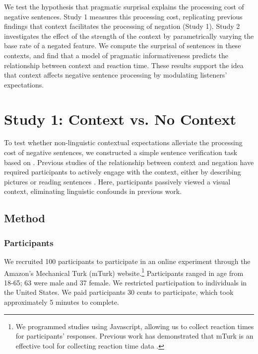 \documentclass[10pt,letterpaper]{article}
\begin{document}
We test the hypothesis that pragmatic surprisal explains the processing cost of negative sentences. Study 1 measures this processing cost, replicating previous findings that context facilitates the processing of negation (Study 1).  Study 2 investigates the effect of the strength of the context by parametrically varying the base rate of a negated feature.  We compute the surprisal of sentences in these contexts, and find that a model of pragmatic informativeness predicts the relationship between context and reaction time.  These results support the idea that context affects negative sentence processing by modulating listeners' expectations. %

\section{Study 1: Context vs. No Context}

To test whether non-linguistic contextual expectations alleviate the processing cost of negative sentences, we constructed a simple sentence verification task based on .  Previous studies of the relationship between context and negation have required participants to actively engage with the context, either by describing pictures \cite{wason1965} or reading sentences \cite{glenberg1999}.  Here, participants passively viewed a visual context, eliminating linguistic confounds in previous work.  

\subsection{Method}

\subsubsection{Participants}

We recruited 100 participants to participate in an online experiment through the Amazon's Mechanical Turk (mTurk) website.\footnote{We programmed studies using Javascript, allowing us to collect reaction times for participants' responses.  Previous work has demonstrated that mTurk is an effective tool for collecting reaction time data \cite{crump2013}.}  Participants ranged in age from 18-65; 63 were male and 37 female.  We restricted participation to individuals in the United States. We paid participants 30 cents to participate, which took approximately 5 minutes to complete.  
\end{document}

